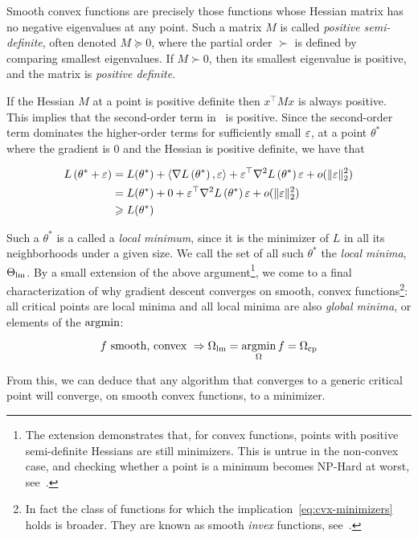 \documentclass[../../thesis.tex]{subfiles}
\begin{document}
Smooth convex functions are precisely those functions whose
Hessian matrix has no negative eigenvalues at any
point.
Such a matrix $M$ is called \emph{positive semi-definite},
often denoted $M \succeq 0$,
where the partial order $\succ$ is defined by
comparing smallest eigenvalues.
If $M \succ 0$, then its smallest eigenvalue is positive,
and the matrix is \emph{positive definite}.

If the Hessian $M$ at a point is positive definite
then $x^\top M x$ is always positive.
This implies that the second-order term in~
is positive.
Since the second-order term dominates the higher-order terms
for sufficiently small $\varepsilon$,
at a point $\theta^*$ where the gradient is $0$
and the Hessian is positive definite,
we have that

\begin{align}
	L\left(\theta^* + \varepsilon\right) &=
	L(\theta^*)
	+ \langle\nabla L\left(\theta^*\right),\varepsilon\rangle
	+ \varepsilon^\top\nabla^2L\left(\theta^*\right)\varepsilon + o(\lVert\varepsilon\rVert_{\scriptstyle2}^2)\\
	&=
	L(\theta^*)
	+ 0
	+ \varepsilon^\top\nabla^2L\left(\theta^*\right)\varepsilon + o(\lVert\varepsilon\rVert_{\scriptstyle2}^2)\\
	&\geqslant
	L(\theta^*)
\end{align}

Such a $\theta^*$ is a called a \emph{local minimum},
since it is the minimizer of $L$ in all its neighborhoods
under a given size.
We call the set of all such $\theta^*$
the \emph{local minima}, $\Theta_{\mathrm{lm}}$.
By a small extension of the above
argument\footnote{The extension demonstrates that,
for convex functions,
points with positive semi-definite Hessians
are still minimizers.
This is untrue in the non-convex case,
and checking whether a point is a minimum becomes NP-Hard at worst,
see~\cite{murty1987}.},
we come to a final characterization
of why gradient descent converges on smooth, convex
functions\footnote{In fact
the class of functions for which the implication~\ref{eq:cvx-minimizers}
holds is broader.
They are known as smooth \emph{invex} functions,
see~\cite{invex2008}.}:
all critical points are local minima
and all local minima are also \emph{global minima},
or elements of the $\mathop{\mathrm{argmin}}$:

\begin{equation}\equationlabel{cvx-minimizers}
	f \text{\ smooth, convex\ }
	\Rightarrow \Omega_{\lm} = \argmin_{\Omega} f = \Omega_{\cp}
\end{equation}

From this, we can deduce
that any algorithm that converges to a generic critical point will converge,
on smooth convex functions, to a minimizer.
\end{document}
